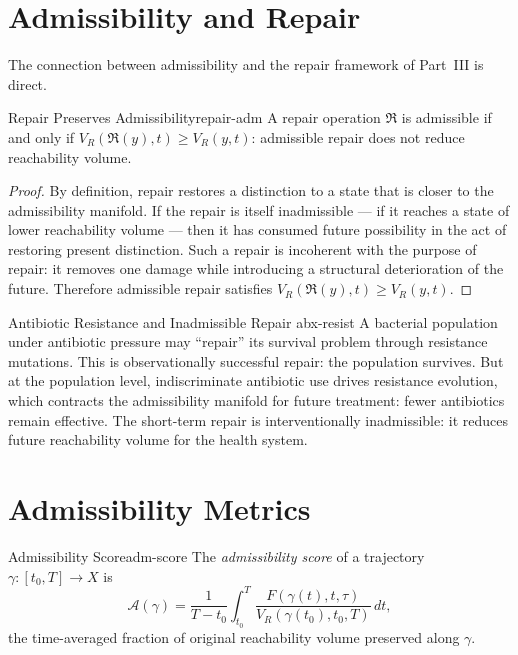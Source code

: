 \documentclass[12pt,twoside,openright]{book}
\newcommand{\bioicon}{\marginpar{\tiny\color{DistTeal}\faDna}}
\newcommand{\repair}{\mathfrak{R}}
\begin{document}
\section{Admissibility and Repair}
\label{sec:ch14-repair}

The connection between admissibility and the repair
framework of Part~III is direct.

\begin{proposition}{Repair Preserves Admissibility}{repair-adm}
  A repair operation $\repair$ is admissible if and only if
  $V_R(\repair(y),t) \ge V_R(y,t)$: admissible repair does
  not reduce reachability volume.
\end{proposition}

\begin{proof}
  By definition, repair restores a distinction to a state
  that is closer to the admissibility manifold. If the
  repair is itself inadmissible --- if it reaches a state
  of lower reachability volume --- then it has consumed
  future possibility in the act of restoring present
  distinction. Such a repair is incoherent with the purpose
  of repair: it removes one damage while introducing a
  structural deterioration of the future. Therefore
  admissible repair satisfies
  $V_R(\repair(y),t)\ge V_R(y,t)$.
\end{proof}

\begin{example}{Antibiotic Resistance and Inadmissible Repair}%
  {abx-resist}
  \bioicon
  A bacterial population under antibiotic pressure may
  ``repair'' its survival problem through resistance
  mutations. This is observationally successful repair: the
  population survives. But at the population level,
  indiscriminate antibiotic use drives resistance evolution,
  which contracts the admissibility manifold for future
  treatment: fewer antibiotics remain effective. The
  short-term repair is interventionally inadmissible: it
  reduces future reachability volume for the health system.
\end{example}

\section{Admissibility Metrics}
\label{sec:ch14-metrics}

\begin{definition}{Admissibility Score}{adm-score}
  The \emph{admissibility score} of a trajectory
  $\gamma:[t_0,T]\to X$ is
  \[
    \mathcal{A}(\gamma)
    = \frac{1}{T-t_0} \int_{t_0}^T
      \frac{F(\gamma(t),t,\tau)}{V_R(\gamma(t_0),t_0,T)}\,dt,
  \]
  the time-averaged fraction of original reachability
  volume preserved along $\gamma$.
\end{definition}
\end{document}

